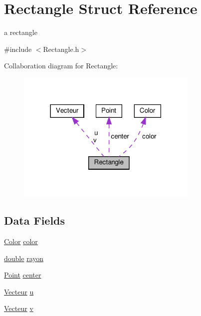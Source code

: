 \hypertarget{struct_rectangle}{}\section{Rectangle Struct Reference}
\label{struct_rectangle}


a rectangle  




{\ttfamily \#include $<$Rectangle.\+h$>$}



Collaboration diagram for Rectangle\+:\nopagebreak
\begin{figure}[H]
\begin{center}
\leavevmode
\includegraphics[width=246pt]{struct_rectangle__coll__graph}
\end{center}
\end{figure}
\subsection*{Data Fields}
\begin{DoxyCompactItemize}
\item 
\hyperlink{struct_color}{Color} \hyperlink{struct_rectangle_aa5f4d1eda21c196bd8401ff73f105073}{color}
\item 
\hyperlink{g3x__transfo_8h_a89b2b23e407882a535d835574a7912e1}{double} \hyperlink{struct_rectangle_a2459aedac9f8646ad9566164a9a83f41}{rayon}
\item 
\hyperlink{struct_point}{Point} \hyperlink{struct_rectangle_a24bb1c337bce91dd3e7a4a4372b11793}{center}
\item 
\hyperlink{struct_vecteur}{Vecteur} \hyperlink{struct_rectangle_a5aa1600754aceabfee725fb390410687}{u}
\item 
\hyperlink{struct_vecteur}{Vecteur} \hyperlink{struct_rectangle_a5ff420022374621dd6186970680c7276}{v}
\end{DoxyCompactItemize}


